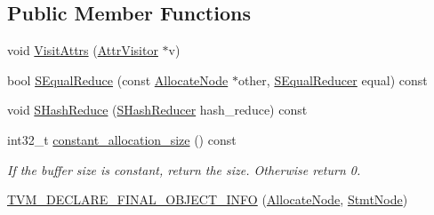 \subsection*{Public Member Functions}
\begin{DoxyCompactItemize}
\item 
void \hyperlink{classtvm_1_1tir_1_1AllocateNode_ab476a2f1664e28a6da78dfa1d7bc2889}{Visit\+Attrs} (\hyperlink{classtvm_1_1AttrVisitor}{Attr\+Visitor} $\ast$v)
\item 
bool \hyperlink{classtvm_1_1tir_1_1AllocateNode_af666f784cf57e890d16a326912955075}{S\+Equal\+Reduce} (const \hyperlink{classtvm_1_1tir_1_1AllocateNode}{Allocate\+Node} $\ast$other, \hyperlink{classtvm_1_1SEqualReducer}{S\+Equal\+Reducer} equal) const 
\item 
void \hyperlink{classtvm_1_1tir_1_1AllocateNode_aa8b61783e619cc9be13115ca7dfe10b2}{S\+Hash\+Reduce} (\hyperlink{classtvm_1_1SHashReducer}{S\+Hash\+Reducer} hash\+\_\+reduce) const 
\item 
int32\+\_\+t \hyperlink{classtvm_1_1tir_1_1AllocateNode_a7e72bb427a2c945d5eb6bec22bd96f82}{constant\+\_\+allocation\+\_\+size} () const 
\begin{DoxyCompactList}\small\item\em If the buffer size is constant, return the size. Otherwise return 0. \end{DoxyCompactList}\item 
\hyperlink{classtvm_1_1tir_1_1AllocateNode_a8df9749b7cd4db25d5de52572be1ba34}{T\+V\+M\+\_\+\+D\+E\+C\+L\+A\+R\+E\+\_\+\+F\+I\+N\+A\+L\+\_\+\+O\+B\+J\+E\+C\+T\+\_\+\+I\+N\+FO} (\hyperlink{classtvm_1_1tir_1_1AllocateNode}{Allocate\+Node}, \hyperlink{classtvm_1_1tir_1_1StmtNode}{Stmt\+Node})
\end{DoxyCompactItemize}
